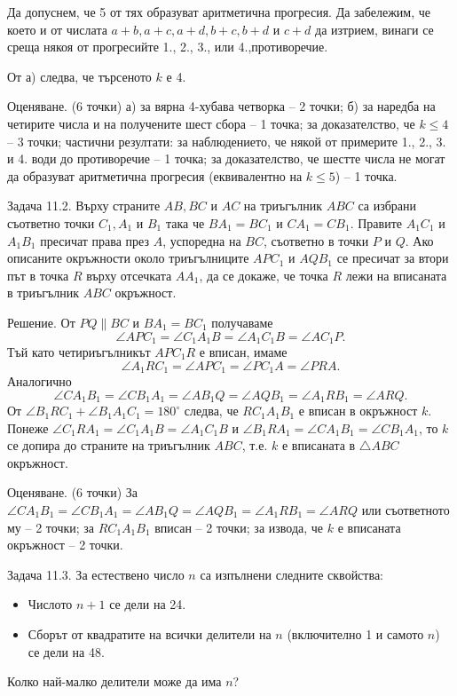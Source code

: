 Да допуснем, че 5 от тях образуват аритметична прогресия. Да забележим, че което и от числата $a+b,a+c,a+d,b+c,b+d$ и $c+d$ да изтрием, винаги се среща някоя от прогресийте 1., 2., 3., или 4.,противоречие.

От а) следва, че търсеното $k$ е 4.

Оценяване. (6 точки) а) за вярна 4-хубава четворка – 2 точки; б) за наредба на четирите числа и на получените шест сбора – 1 точка; за доказателство, че $k\leq4$ – 3 точки; частични резултати: за наблюдението, че някой от примерите 1., 2., 3. и 4. води до противоречие – 1 точка; за доказателство, че шестте числа не могат да образуват аритметична прогресия (еквивалентно на $k\leq5$) – 1 точка.

Задача 11.2. Върху страните $AB,BC$ и $AC$ на триъгълник $ABC$ са избрани съответно точки $C_1,A_1$ и $B_1$ така че $BA_1=BC_1$ и $CA_1=CB_1$. Правите $A_1C_1$ и $A_1B_1$ пресичат права през $A$, успоредна на $BC$, съответно в точки $P$ и $Q$. Ако описаните окръжности около триъгълниците $APC_1$ и $AQB_1$ се пресичат за втори път в точка $R$ върху отсечката $AA_1$, да се докаже, че точка $R$ лежи на вписаната в триъгълник $ABC$ окръжност.

Решение. От $PQ\parallel BC$ и $BA_1=BC_1$ получаваме
$$
\angle APC_1=\angle C_1A_1B=\angle A_1C_1B=\angle AC_1P.
$$
Тъй като четириъгълникът $APC_1R$ е вписан, имаме
$$
\angle A_1RC_1=\angle APC_1=\angle PC_1A=\angle PRA.
$$
Аналогично
$$
\angle CA_1B_1=\angle CB_1A_1=\angle AB_1Q=\angle AQB_1=\angle A_1RB_1=\angle ARQ.
$$
От $\angle B_1RC_1+\angle B_1A_1C_1=180^\circ$ следва, че $RC_1A_1B_1$ е вписан в окръжност $k$. Понеже $\angle C_1RA_1=\angle C_1A_1B=\angle A_1C_1B$ и $\angle B_1RA_1=\angle CA_1B_1=\angle CB_1A_1$, то $k$ се допира до страните на триъгълник $ABC$, т.е. $k$ е вписаната в $\triangle ABC$ окръжност.

Оценяване. (6 точки) За $\angle CA_1B_1=\angle CB_1A_1=\angle AB_1Q=\angle AQB_1=\angle A_1RB_1=\angle ARQ$ или съответното му – 2 точки; за $RC_1A_1B_1$ вписан – 2 точки; за извода, че $k$ е вписаната окръжност – 2 точки.

Задача 11.3. За естествено число $n$ са изпълнени следните сквойства:
\begin{itemize}
\item Числото $n+1$ се дели на 24.
\item Сборът от квадратите на всички делители на $n$ (включително 1 и самото $n$) се дели на 48.
\end{itemize}
Колко най-малко делители може да има $n$?

